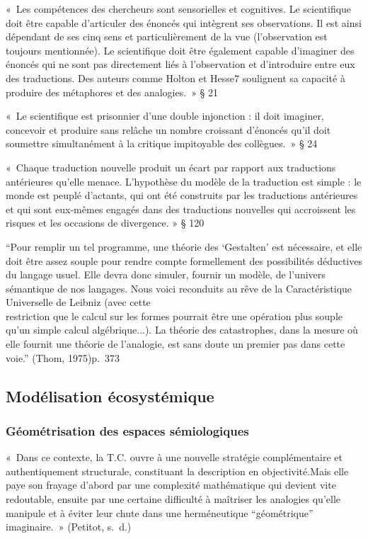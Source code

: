 \documentclass[
  a4paper,
  DIV=11,
  numbers=noendperiod]{scrreprt}
\begin{document}
«~Les compétences des chercheurs sont sensorielles et cognitives. Le
scientifique doit être capable d'articuler des énoncés qui intègrent ses
observations. Il est ainsi dépendant de ses cinq sens et
particulièrement de la vue (l'observation est toujours mentionnée). Le
scientifique doit être également capable d'imaginer des énoncés qui ne
sont pas directement liés à l'observation et d'introduire entre eux des
traductions. Des auteurs comme Holton et Hesse7 soulignent sa capacité à
produire des métaphores et des analogies.~» § 21

«~Le scientifique est prisonnier d'une double injonction : il doit
imaginer, concevoir et produire sans relâche un nombre croissant
d'énoncés qu'il doit soumettre simultanément à la critique impitoyable
des collègues.~» § 24

«~Chaque traduction nouvelle produit un écart par rapport aux
traductions antérieures qu'elle menace. L'hypothèse du modèle de la
traduction est simple : le monde est peuplé d'actants, qui ont été
construits par les traductions antérieures et qui sont eux-mêmes engagés
dans des traductions nouvelles qui accroissent les risques et les
occasions de divergence. » § 120

``Pour remplir un tel programme, une théorie des `Gestalten' est
nécessaire, et elle doit être assez souple pour rendre compte
formellement des possibilités déductives du langage usuel. Elle devra
donc simuler, fournir un modèle, de l'univers sémantique de nos
langages. Nous voici reconduits au rêve de la Caractéristique
Universelle de Leibniz (avec cette\\
restriction que le calcul sur les formes pourrait être une opération
plus souple qu'un simple calcul algébrique...). La théorie des
catastrophes, dans la mesure où elle fournit une théorie de l'analogie,
est sans doute un premier pas dans cette voie.'' (Thom, 1975)p.~373

\subsection{Modélisation
écosystémique}\label{moduxe9lisation-uxe9cosystuxe9mique}

\subsubsection{Géométrisation des espaces
sémiologiques}\label{guxe9omuxe9trisation-des-espaces-suxe9miologiques}

«~Dans ce contexte, la T.C. ouvre à une nouvelle stratégie
complémentaire et authentiquement structurale, constituant la
description en objectivité.Mais elle paye son frayage d'abord par une
complexité mathématique qui devient vite redoutable, ensuite par une
certaine difficulté à maîtriser les analogies qu'elle manipule et à
éviter leur chute dans une herméneutique ``géométrique'' imaginaire.~»
(Petitot, s.~d.)
\end{document}

